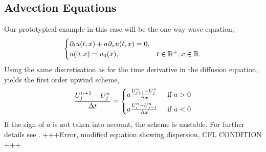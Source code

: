     \subsection{Advection Equations}
    Our prototypical example in this case will be the one-way wave equation,
    \begin{equation}\begin{cases}
    \partial_t u(t,x) + a\partial_x u(t,x)=0,\\
    u(0,x) = u_0(x),  &t\in\mathbb{R}^+, x\in\mathbb{R}.
    \end{cases}\label{eq:wave}\end{equation}
    Using the same discretisation as for the time derivative in the diffusion equation, yields the first order upwind scheme,
    \[
    \frac{U^{n+1}_{j}-U^{n}_{j}}{\Delta t} = \begin{cases} a\frac{U^{n}_{j+1}-U^{n}_{j}}{\Delta x} & \text{ if } a>0\\[0.5em]
    a\frac{U^{n}_{j}-U^{n}_{j-1}}{\Delta x} & \text{ if } a<0\\
    \end{cases}
    \]
    If the sign of \(a\) is not taken into account, the scheme is unstable. For further details see \cite{Hundsdorfer2007}.
    +++Error, modified equation showing dispersion, CFL CONDITION +++
    
